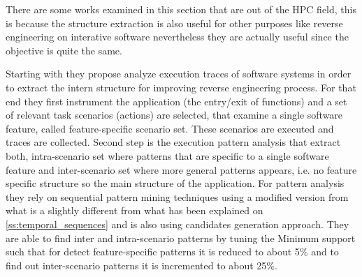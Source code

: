 
There are some works examined in this section that are out of the HPC field,
this is because the structure extraction is also useful for other purposes like
reverse engineering on interative software nevertheless they are actually useful
since the objective is quite the same.

Starting with \cite{Safyallah2006} they propose analyze execution
traces of software systems in order to extract the intern structure for
improving reverse engineering process. For
that end they first instrument the application (the entry/exit of functions) and 
a set of relevant task scenarios (actions) are selected, that examine a 
single software feature, called feature-specific scenario set. These scenarios
are executed and traces are collected. Second step is the execution pattern
analysis that extract both, intra-scenario set where patterns that are specific
to a single software feature and inter-scenario set where more general
patterns appears, i.e. no feature specific structure so the main structure of 
the application. For pattern analysis they rely on sequential pattern mining
techniques using a modified version from \cite{Agrawal_seqpatt} what is a
slightly different from what has been explained on \ref{ss:temporal_sequences} 
and is also using candidates generation approach. They are able to find inter
and intra-scenario patterns by tuning the Minimum support such that for detect
feature-specific patterns it is reduced to about 5\% and to find out
inter-scenario patterns it is incremented to about 25\%.

